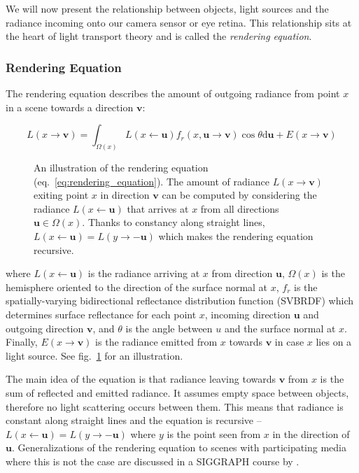 We will now present the relationship between objects, light sources and the radiance incoming onto our camera sensor or eye retina. This relationship sits at the heart of light transport theory and is called the \textit{rendering equation}.

\subsubsection{Rendering Equation}
\label{section:background-projection_mapping-light_transport-rendering_equation}

The rendering equation describes the amount of outgoing radiance from point \(x\) in a scene towards a direction \(\bm{v}\):

\begin{equation}
    \label{eq:rendering_equation}
    L(x \rightarrow \bm{v}) = \int_{\Omega(x)} L(x \leftarrow \bm{u}) f_r(x, \bm{u} \rightarrow \bm{v}) \cos \theta \mathrm{d}\bm{u} + E(x \rightarrow \bm{v})
\end{equation}

\begin{figure}[t]
    \centering
    \def\svgwidth{0.6\textwidth}
    
    \caption{An illustration of the rendering equation (eq.~\ref{eq:rendering_equation}). The amount of radiance \(L(x \rightarrow \bm{v})\) exiting point \(x\) in direction \(\bm{v}\) can be computed by considering the radiance \(L(x \leftarrow \bm{u})\) that arrives at \(x\) from all directions \(\bm{u} \in \Omega(x)\). Thanks to constancy along straight lines, \(L(x \leftarrow \bm{u}) = L(y \rightarrow \bm{-u})\) which makes the rendering equation recursive.}
    \label{fig:background_rendering_eq}
\end{figure}

where \(L(x \leftarrow \bm{u})\) is the radiance arriving at \(x\) from direction \(\bm{u}\), \(\Omega(x)\) is the hemisphere oriented to the direction of the surface normal at \(x\), \(f_r\) is the spatially-varying bidirectional reflectance distribution function (SVBRDF) which determines surface reflectance for each point \(x\), incoming direction \(\bm{u}\) and outgoing direction \(\bm{v}\), and \(\theta\) is the angle between \(u\) and the surface normal at \(x\). Finally, \(E(x \rightarrow \bm{v})\) is the radiance emitted from \(x\) towards \(\bm{v}\) in case \(x\) lies on a light source. See fig.~\ref{fig:background_rendering_eq} for an illustration.

The main idea of the equation is that radiance leaving towards \(\bm{v}\) from \(x\) is the sum of reflected and emitted radiance. It assumes empty space between objects, therefore no light scattering occurs between them. This means that radiance is constant along straight lines and the equation is recursive -- \(L(x \leftarrow \bm{u}) = L(y \rightarrow -\bm{u})\) where \(y\) is the point seen from \(x\) in the direction of \(\bm{u}\). Generalizations of the rendering equation to scenes with participating media where this is not the case are discussed in a SIGGRAPH course by \citet{Novak2018}.

